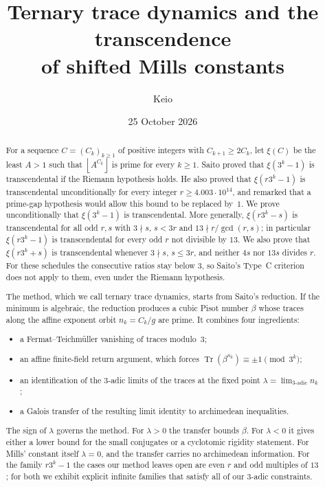 \documentclass[11pt,a4paper]{article}
\title{Ternary trace dynamics and the transcendence\\ of shifted Mills constants}
\author{Keio}
\date{25 October 2026}
\theoremstyle{definition}
\theoremstyle{remark}
\DeclareMathOperator{\Tr}{Tr}
\newcommand{\floor}[1]{\left\lfloor #1\right\rfloor}
\begin{document}
\maketitle

\begin{abstract}
For a sequence $C=(C_k)_{k\ge1}$ of positive integers with $C_{k+1}\ge 2C_k$, let $\xi(C)$ be the least $A>1$ such that $\floor{A^{C_k}}$ is prime for every $k\ge1$.
Saito proved that $\xi(3^k-1)$ is transcendental if the Riemann hypothesis holds.
He also proved that $\xi(r3^k-1)$ is transcendental unconditionally for every integer $r\ge 4.003\cdot10^{14}$, and remarked that a prime-gap hypothesis would allow this bound to be replaced by~$1$.
We prove unconditionally that $\xi(3^k-1)$ is transcendental.
More generally, $\xi(r3^k-s)$ is transcendental for all odd $r,s$ with $3\nmid s$, $s<3r$ and $13\nmid r/\gcd(r,s)$; in particular $\xi(r3^k-1)$ is transcendental for every odd $r$ not divisible by $13$.
We also prove that $\xi(r3^k+s)$ is transcendental whenever $3\nmid s$, $s\le 3r$, and neither $4s$ nor $13s$ divides $r$. For these schedules the consecutive ratios stay below $3$, so Saito's Type~C criterion does not apply to them, even under the Riemann hypothesis.

The method, which we call ternary trace dynamics, starts from Saito's reduction. If the minimum is algebraic, the reduction produces a cubic Pisot number $\beta$ whose traces along the affine exponent orbit $n_k=C_k/g$ are prime.
It combines four ingredients:
\begin{itemize}
\item a Fermat--Teichm\"uller vanishing of traces modulo~$3$;
\item an affine finite-field return argument, which forces $\Tr(\beta^{n_k})\equiv\pm1\pmod{3^k}$;
\item an identification of the $3$-adic limits of the traces at the fixed point $\lambda=\lim_{3\text{-adic}}n_k$;
\item a Galois transfer of the resulting limit identity to archimedean inequalities.
\end{itemize}
The sign of $\lambda$ governs the method.
For $\lambda>0$ the transfer bounds $\beta$.
For $\lambda<0$ it gives either a lower bound for the small conjugates or a cyclotomic rigidity statement.
For Mills' constant itself $\lambda=0$, and the transfer carries no archimedean information.
For the family $r3^k-1$ the cases our method leaves open are even $r$ and odd multiples of $13$; for both we exhibit explicit infinite families that satisfy all of our $3$-adic constraints.
\end{abstract}
\end{document}
